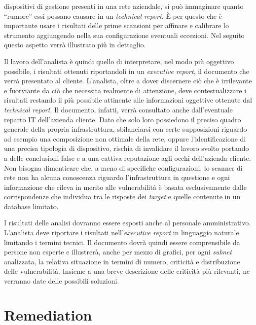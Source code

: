 \documentclass[target=bach,aauheader=]{thud}
\begin{document}
dispositivi di gestione presenti in una rete aziendale, si può immaginare quanto “rumore” essi possano causare in un \textit{technical report}. È per questo che è importante usare i risultati delle prime scansioni per affinare e calibrare lo strumento aggiungendo nella sua configurazione eventuali eccezioni. Nel seguito questo aspetto verrà illustrato più in dettaglio.

Il lavoro dell’analista è quindi quello di interpretare, nel modo più oggettivo possibile, i risultati ottenuti riportandoli in un \textit{executive report}, il documento che verrà presentato al cliente. L’analista, oltre a dover discernere ciò che è irrilevante e fuorviante da ciò che necessita realmente di attenzione, deve contestualizzare i risultati restando il più possibile attinente alle informazioni oggettive ottenute dal \textit{technical report}. Il documento, infatti, verrà consultato anche dall’eventuale reparto IT dell’azienda cliente. Dato che solo loro possiedono il preciso quadro generale della propria infrastruttura, sbilanciarsi con certe supposizioni riguardo ad esempio una composizione non ottimale della rete, oppure l’identificazione di una precisa tipologia di dispositivo, rischia di invalidare il lavoro svolto portando a delle conclusioni false e a una cattiva reputazione agli occhi dell’azienda cliente. Non bisogna dimenticare che, a meno di specifiche configurazioni, lo scanner di rete non ha alcuna conoscenza riguardo l’infrastruttura in questione e ogni informazione che rileva in merito alle vulnerabilità è basata esclusivamente dalle corrispondenze che individua tra le risposte dei \textit{target} e quelle contenute in un database limitato.

I risultati delle analisi dovranno essere esposti anche al personale amministrativo. L’analista deve riportare i risultati nell’\textit{executive report} in linguaggio naturale limitando i termini tecnici. Il documento dovrà quindi essere comprensibile da persone non esperte e illustrerà, anche per mezzo di grafici, per ogni \textit{subnet} analizzata, la relativa situazione in termini di numero, criticità e distribuzione delle vulnerabilità. Insieme a una breve descrizione delle criticità più rilevanti, ne verranno date delle possibili soluzioni.

\section{Remediation}
\end{document}
